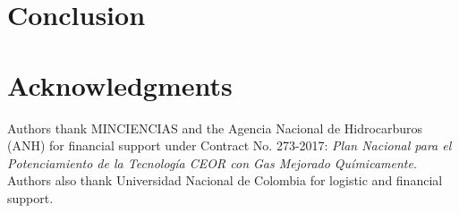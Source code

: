 \documentclass[review]{elsarticle}
\begin{document}
\section{Conclusion}\label{sec:conclusions}

\section*{Acknowledgments}
Authors thank MINCIENCIAS and the Agencia Nacional de Hidrocarburos (ANH) for financial support under Contract No. 273-2017: \textit{Plan Nacional para el Potenciamiento de la Tecnolog\'{i}a CEOR con Gas Mejorado Qu\'{i}micamente}. Authors also thank Universidad Nacional de Colombia for logistic and financial support.


\end{document}
